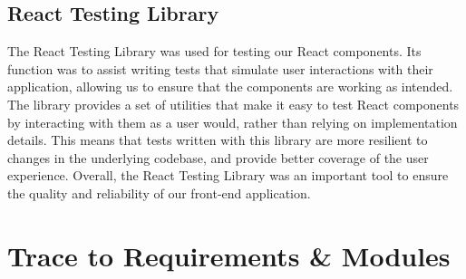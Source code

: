 \documentclass[12pt, titlepage]{article}
\begin{document}
\subsection{React Testing Library}
The React Testing Library was used for testing our React components. 
Its function was to assist writing tests that simulate user 
interactions with their application, allowing us to ensure that the components 
are working as intended. The library provides a set of utilities that make it 
easy to test React components by interacting with them as a user would, rather 
than relying on implementation details. This means that tests written with this library
are more resilient to changes in the underlying codebase, and 
provide better coverage of the user experience. Overall, the React Testing Library
was an important tool to ensure the quality and reliability
of our front-end application.
		
\section{Trace to Requirements \& Modules}
\end{document}
